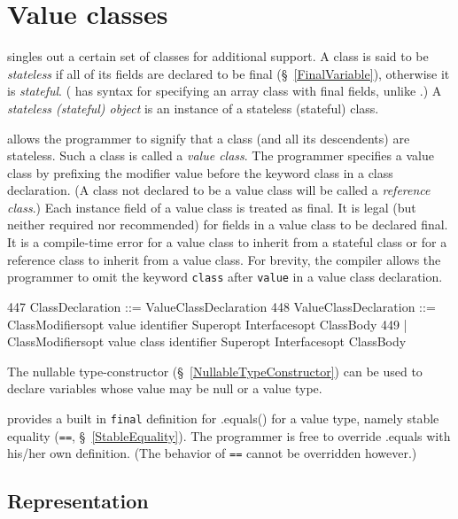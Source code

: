 \section{Value classes}\label{ValueClasses}

{}\Xten{} singles out a certain set of classes for additional
support. A class is said to be {\em stateless} if all of its fields
are declared to be {\cf final} (\S~\ref{FinalVariable}), otherwise it
is {\em stateful}. (\Xten{} has syntax for specifying an array class
with final fields, unlike \java{}.) A {\em stateless (stateful)
object} is an instance of a stateless (stateful) class.

{}\Xten{} allows the programmer to signify that a class (and all its
descendents) are stateless. Such a class is called a {\em value
class}.  The programmer specifies a value class by prefixing the
modifier {\cf value} before the keyword {\cf class} in a class
declaration.  (A class not declared to be a value class will be called
a {\em reference class}.)  Each instance field of a value class is
treated as {\cf final}. It is legal (but neither required nor recommended)
for fields in a value class to be declared final. It is a compile-time
error for a value class to inherit from a stateful class or for a
reference class to inherit from a value class. For brevity, the \Xten{}
compiler allows the programmer to omit the keyword {\tt class} after
{\tt  value} in a value class declaration.

\begin{x10}
447  ClassDeclaration ::= ValueClassDeclaration
448  ValueClassDeclaration ::= 
       ClassModifiersopt value identifier Superopt 
          Interfacesopt ClassBody
449  | ClassModifiersopt value class identifier 
          Superopt Interfacesopt ClassBody
\end{x10}

The {\cf nullable} type-constructor (\S~\ref{NullableTypeConstructor}) can
be used to declare variables whose value may be {\cf null} or a value
type.

{}\Xten{} provides a built in {\tt final} definition for {\cf
.equals()} for a value type, namely stable equality ({\tt ==},
\S~\ref{StableEquality}). The programmer is free to override {\cf
.equals} with his/her own definition. (The behavior of {\tt ==} cannot
be overridden however.)

\subsection{Representation}

